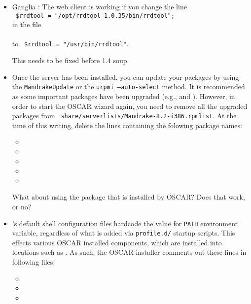 \begin{itemize}
\item Ganglia : The web client is working if you change the line \\
  \verb+ $rrdtool = "/opt/rrdtool-1.0.35/bin/rrdtool";+ \\
  in the file \\
  \\ 
  to \verb+ $rrdtool = "/usr/bin/rrdtool"+.
  
  \begin{discuss}
    This needs to be fixed before 1.4 soup.
  \end{discuss}
  
\item Once the server has been installed, you can update your packages
  by using the {\tt MandrakeUpdate} or the {\tt urpmi --auto-select}
  method. It is recommended as some important packages have been
  upgraded (e.g.,  and ).  However,
  in order to start the OSCAR wizard again, you need to remove all the
  upgraded packages from {\tt
    share/serverlists/Mandrake-8.2-i386.rpmlist}.  At the time of this
  writing, delete the lines containing the folowing package names:

  \begin{itemize}
  \item {}
  \item {}
  \item {}
  \item {}
  \item {}
  \end{itemize}
  
  \begin{discuss}
    What about using the  package that is
    installed by OSCAR?  Does that work, or no?
  \end{discuss}

\item {}'s default shell configuration files hardcode the
  value for {\tt PATH} environment variable, regardless of what is
  added via {\tt profile.d/} startup scripts.  This effects various
  OSCAR installed components, which are installed into locations such
  as .  As such, the OSCAR installer comments out these
  lines in following files:

  \begin{itemize}
  \item {}
  \item {}
  \item {}
  \end{itemize}

\end{itemize}

